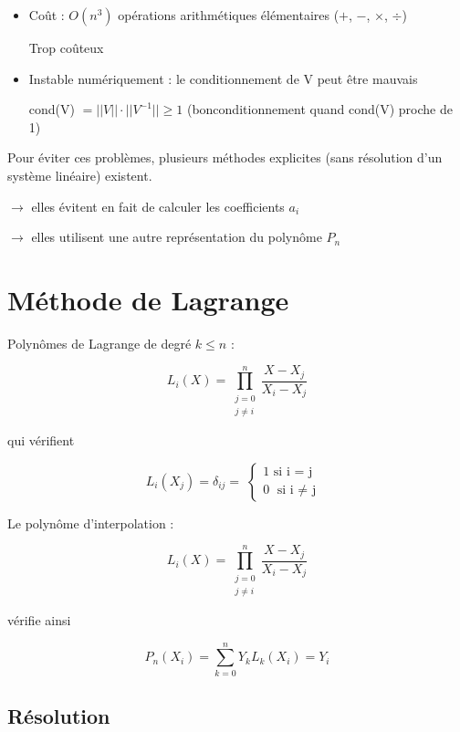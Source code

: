 \begin{itemize}
\item Coût : $O(n^3)$ opérations arithmétiques élémentaires ($+$, $-$, $\times$, $\div$)

Trop coûteux
\item Instable numériquement : le conditionnement de V peut être \og mauvais\fg

cond(V) $= ||V|| \cdot ||V^{-1}|| \ge 1$ (\og bon\fg  conditionnement quand cond(V) proche de 1)
\end{itemize}

Pour éviter ces problèmes, plusieurs méthodes explicites (sans résolution d'un système linéaire) existent.

$\rightarrow$ elles évitent en fait de calculer les coefficients $a_i$

$\rightarrow$ elles utilisent une autre représentation du polynôme $P_n$


\section {Méthode de Lagrange}

Polynômes de Lagrange de degré $k \le n$ :

\begin{equation}
    L_i(X) = \prod_{\substack{j = 0\\j \ne i}}^n \frac{X - X_j}{X_i - X_j}
\end{equation}

qui vérifient


\[
    L_i(X_j) = \delta _{ij} = \;
    \left\lbrace
    \begin{array}{cc|c}
            1 \text{ si i = j } \\
            0 \text{ si i $\ne$ j }
    \end{array}
    \right.
\]


Le polynôme d'interpolation :

\begin{equation}
    L_i(X) = \prod_{\substack{j = 0\\j \ne i}}^n \frac{X - X_j}{X_i - X_j}
\end{equation}

vérifie ainsi

\begin{equation}
    P_n(X_i) = \sum_{k = 0}^n Y_k L_k(X_i) = Y_i
\end{equation}



\subsection* {Résolution}

